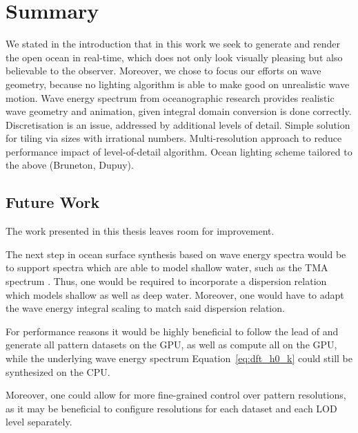 \chapter{Summary}
\label{ch:summary}

We stated in the introduction that in this work we seek to generate and render the
open ocean in real-time, which does not only look visually pleasing but also
believable to the observer.
Moreover, we chose to focus our efforts on wave geometry, because no lighting algorithm
is able to make good on unrealistic wave motion.
Wave energy spectrum from oceanographic research provides realistic wave geometry
and animation, given integral domain conversion is done correctly.
Discretisation is an issue, addressed by additional levels of detail.
Simple solution for tiling via sizes with irrational numbers.
Multi-resolution approach to reduce performance impact of level-of-detail
algorithm.
Ocean lighting scheme tailored to the above (Bruneton, Dupuy).

\section{Future Work}
The work presented in this thesis leaves room for improvement.

The next step in ocean surface synthesis based on wave energy spectra would be
to support spectra which are able to model shallow water, such as the
TMA spectrum \citep{Hughes:1984}.
Thus, one would be required to incorporate a dispersion relation which models
shallow as well as deep water. Moreover, one would have
to adapt the wave energy integral scaling to match said dispersion relation.
\cite{Horvath:2015}

For performance reasons it would be highly beneficial to follow the lead of
\cite{misc:oceanlightingfft} and generate all pattern datasets on the GPU,
as well as compute all \InvDiscreteFourierTransforms on the GPU, while the
underlying wave energy spectrum Equation~\ref{eq:dft_h0_k} could still be synthesized on the CPU.

Moreover, one could allow for more fine-grained control over pattern resolutions,
as it may be beneficial to configure resolutions for each dataset and each LOD
level separately.
